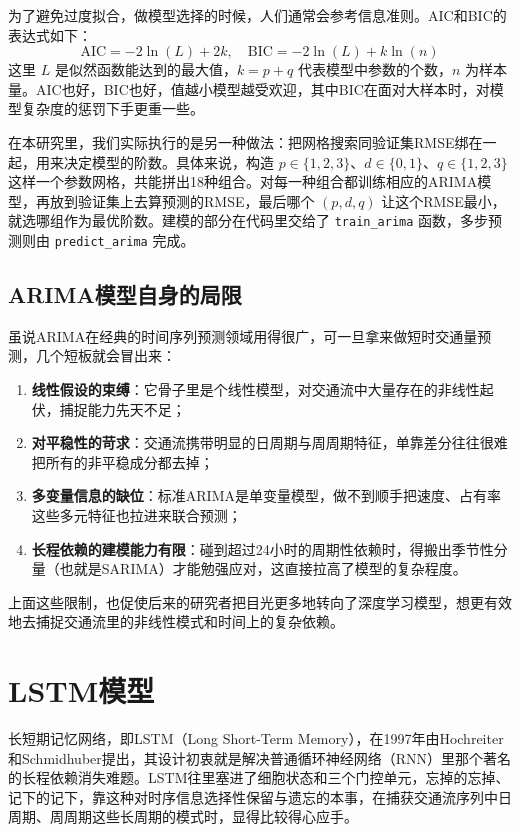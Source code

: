 \documentclass[12pt,a4paper,oneside]{ctexbook}
\begin{document}
	为了避免过度拟合，做模型选择的时候，人们通常会参考信息准则。AIC和BIC的表达式如下：
	\[
	\text{AIC} = -2\ln(L) + 2k, \quad \text{BIC} = -2\ln(L) + k\ln(n)
	\]
	这里 $L$ 是似然函数能达到的最大值，$k = p + q$ 代表模型中参数的个数，$n$ 为样本量。AIC也好，BIC也好，值越小模型越受欢迎，其中BIC在面对大样本时，对模型复杂度的惩罚下手更重一些。
	
	在本研究里，我们实际执行的是另一种做法：把网格搜索同验证集RMSE绑在一起，用来决定模型的阶数。具体来说，构造 $p \in \{1,2,3\}$、$d \in \{0,1\}$、$q \in \{1,2,3\}$ 这样一个参数网格，共能拼出18种组合。对每一种组合都训练相应的ARIMA模型，再放到验证集上去算预测的RMSE，最后哪个 $(p,d,q)$ 让这个RMSE最小，就选哪组作为最优阶数。建模的部分在代码里交给了 \texttt{train\_arima} 函数，多步预测则由 \texttt{predict\_arima} 完成。
	
	\subsection{ARIMA模型自身的局限}
	
	虽说ARIMA在经典的时间序列预测领域用得很广，可一旦拿来做短时交通量预测，几个短板就会冒出来：
	\begin{enumerate}
		\item \textbf{线性假设的束缚}：它骨子里是个线性模型，对交通流中大量存在的非线性起伏，捕捉能力先天不足；
		\item \textbf{对平稳性的苛求}：交通流携带明显的日周期与周周期特征，单靠差分往往很难把所有的非平稳成分都去掉；
		\item \textbf{多变量信息的缺位}：标准ARIMA是单变量模型，做不到顺手把速度、占有率这些多元特征也拉进来联合预测；
		\item \textbf{长程依赖的建模能力有限}：碰到超过24小时的周期性依赖时，得搬出季节性分量（也就是SARIMA）才能勉强应对，这直接拉高了模型的复杂程度。
	\end{enumerate}
	上面这些限制，也促使后来的研究者把目光更多地转向了深度学习模型，想更有效地去捕捉交通流里的非线性模式和时间上的复杂依赖。
	
	\section{LSTM模型}
	
	长短期记忆网络，即LSTM（Long Short-Term Memory），在1997年由Hochreiter和Schmidhuber提出，其设计初衷就是解决普通循环神经网络（RNN）里那个著名的长程依赖消失难题。LSTM往里塞进了细胞状态和三个门控单元，忘掉的忘掉、记下的记下，靠这种对时序信息选择性保留与遗忘的本事，在捕获交通流序列中日周期、周周期这些长周期的模式时，显得比较得心应手。
	
\end{document}
